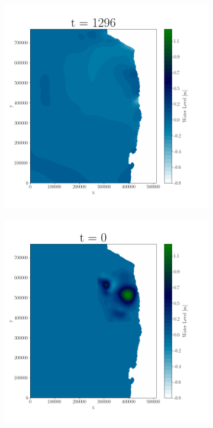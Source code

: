 \begin{figure}[H]
\centering
\begin{subfigure}[b]{.4\linewidth}
\includegraphics[width=\linewidth]{Figures/1-1.png}
\caption{}
\end{subfigure}
\begin{subfigure}[b]{.4\linewidth}
\includegraphics[width=\linewidth]{Figures/1-2.png}
\caption{}
\end{subfigure}


\end{figure}
